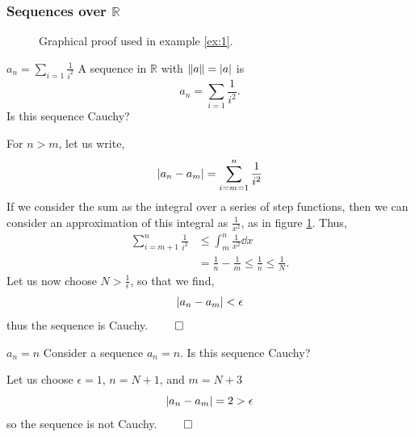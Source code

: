 \documentclass{book}
\begin{document}
\subsubsection{Sequences over $\mathbb{R}$}
	\begin{figure}
		\centering
	\caption{Graphical proof used in example \ref{ex:1}.}
	\label{fig:proof1}
\end{figure}
\begin{Examples}{$a_n = \sum_{i=1} \frac{1}{i^2}$}{}
	A sequence in $\mathbb{R}$ with $\norm{a} = \abs{a}$ is
	\begin{equation}
		a_n =  \sum_{i=1}\frac{1}{i^2}.
	\end{equation}
	Is this sequence Cauchy?
\end{Examples}
	For $n > m$, let us write,
	\begin{equation}
		\abs{a_n - a_m} = \sum_{i=m=1}^{n} \frac{1}{i^2}
	\end{equation}
	If we consider the sum as the integral over a series of step functions, then we can consider an approximation of this integral as $\frac{1}{x^2}$, as in figure \ref{fig:proof1}. Thus,
	\begin{equation}
		\begin{split}
			\sum_{i = m+1}^{n}\frac{1}{i^2} & \leq \int_m^n \frac{1}{x^2}\dd{x} \\
			& = \frac{1}{n} - \frac{1}{m} \leq \frac{1}{n} \leq \frac{1}{N}.
		\end{split}
	\end{equation}
	Let us now choose $N > \frac{1}{\epsilon}$, so that we find,
	\begin{equation}
		\abs{a_n - a_m} < \epsilon
	\end{equation}
	thus the sequence is Cauchy. $\qed$
\begin{Examples}{$a_n = n$}
	Consider a sequence $a_n = n$. Is this sequence Cauchy?
\end{Examples}
Let us choose $\epsilon = 1$, $n = N+1$, and $m = N + 3$
	\begin{equation}
		\abs{a_n - a_m} = 2 > \epsilon
	\end{equation}
	so the sequence is not Cauchy. $\qed$
\end{document}
